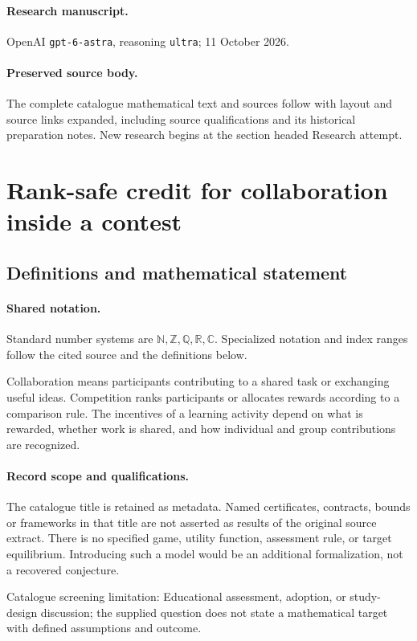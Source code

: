 \documentclass[11pt]{article}
\begin{document}
\paragraph{Research manuscript.} OpenAI \texttt{gpt-6-astra}, reasoning \texttt{ultra}; 11 October 2026.
\paragraph{Preserved source body.} The complete catalogue mathematical text and sources follow with layout and source links expanded, including source qualifications and its historical preparation notes. New research begins at the section headed Research attempt.

\section{Rank-safe credit for collaboration inside a contest}\label{statement}

\subsection{Definitions and mathematical statement}

\paragraph{Shared notation.}Standard number systems are $\mathbb N,\mathbb Z,\mathbb Q,\mathbb R,\mathbb C$. Specialized notation and index ranges follow the cited source and the definitions below.


Collaboration means participants contributing to a shared task or exchanging useful ideas. Competition ranks participants or allocates rewards according to a comparison rule. The incentives of a learning activity depend on what is rewarded, whether work is shared, and how individual and group contributions are recognized.
\paragraph{Record scope and qualifications.}
The catalogue title is retained as metadata. Named certificates, contracts, bounds or frameworks in that title are not asserted as results of the original source extract.
There is no specified game, utility function, assessment rule, or target equilibrium. Introducing such a model would be an additional formalization, not a recovered conjecture.

Catalogue screening limitation: Educational assessment, adoption, or study-design discussion; the supplied question does not state a mathematical target with defined assumptions and outcome.
\end{document}
